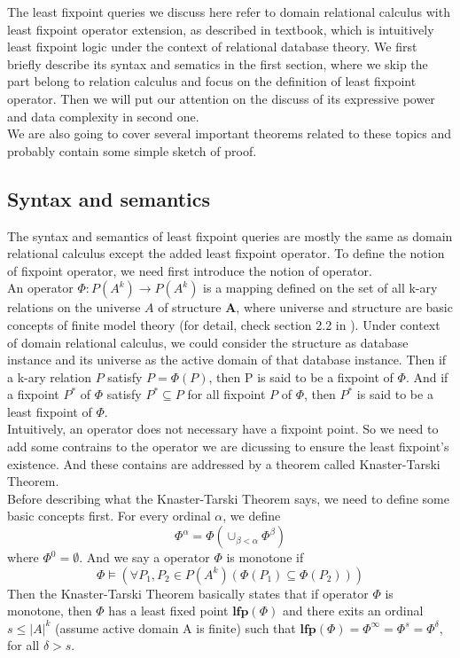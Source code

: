 The least fixpoint queries we discuss here refer to domain relational calculus with least fixpoint operator extension, as described in textbook\cite{Abiteboul1}, which is intuitively least fixpoint logic under the context of relational database theory. We first briefly describe its syntax and sematics in the first section, where we skip the part belong to relation calculus and focus on the definition of least fixpoint operator. Then we will put our attention on the discuss of its expressive power and data complexity in second one. \\
We are also going to cover several important theorems related to these topics and probably contain some simple sketch of proof.

\subsection{Syntax and semantics}
The syntax and semantics of least fixpoint queries are mostly the same as domain relational calculus except the added least fixpoint operator. To define the notion of fixpoint operator, we need first introduce the notion of operator. \\
An operator $\Phi: \textit{P}(A^k)\rightarrow \textit{P}(A^k)$ is a mapping defined on the set of all k-ary relations on the universe $A$ of structure $\textbf{A}$, where universe and structure are basic concepts of finite model theory (for detail, check section 2.2 in \cite{kolaitis1}). Under context of domain relational calculus, we could consider the structure as database instance and its universe as the active domain of that database instance. Then if a k-ary relation $P$ satisfy $P=\Phi(P)$, then P is said to be a fixpoint of $\Phi$. And if a fixpoint $P^*$ of $\Phi$ satisfy $P^*\subseteq P$ for all fixpoint $P$ of $\Phi$, then $P^*$ is said to be a least fixpoint of $\Phi$.\\
Intuitively, an operator does not necessary have a fixpoint point. So we need to add some contrains to the operator we are dicussing to ensure the least fixpoint's existence. And these contains are addressed by a theorem called Knaster-Tarski Theorem\cite{Tarski}. \\
Before describing what the Knaster-Tarski Theorem says, we need to define some basic concepts first. For every ordinal $\alpha$, we define 
$$\Phi^{\alpha}=\Phi(\cup_{\beta<\alpha} \Phi^{\beta})$$
where $\Phi^0=\emptyset$. And we say a operator $\Phi$ is monotone if 
$$\Phi\models(\forall P_1,P_2\in P(A^k)(\Phi(P_1)\subseteq\Phi(P_2)))$$
Then the Knaster-Tarski Theorem basically states that if operator $\Phi$ is monotone, then $\Phi$ has a least fixed point $\textbf{lfp}(\Phi)$ and there exits an ordinal $s\leq |A|^k$ (assume active domain A is finite) such that $\textbf{lfp}(\Phi)=\Phi^{\infty}=\Phi^s=\Phi^{\delta}$, for all $\delta > s$.\\

